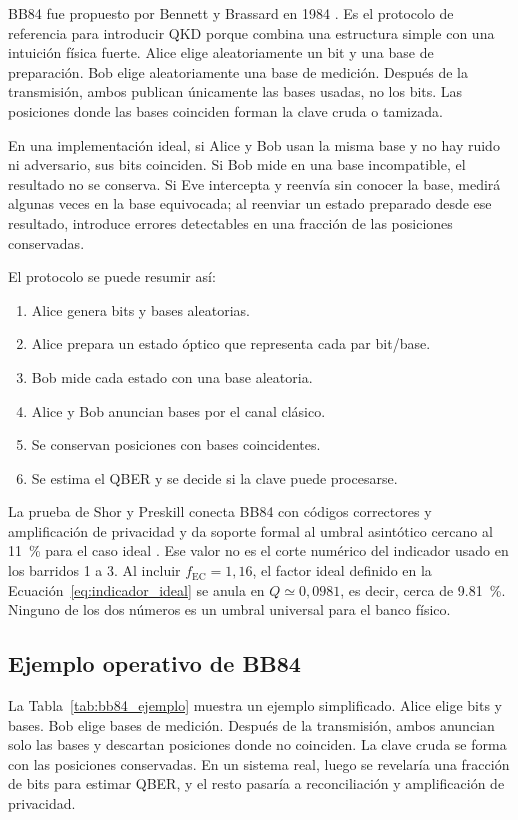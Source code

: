 BB84 fue propuesto por Bennett y Brassard en 1984 \cite{bennettBrassard1984}. Es el protocolo de referencia para introducir QKD porque combina una estructura simple con una intuición física fuerte. Alice elige aleatoriamente un bit y una base de preparación. Bob elige aleatoriamente una base de medición. Después de la transmisión, ambos publican únicamente las bases usadas, no los bits. Las posiciones donde las bases coinciden forman la clave cruda o tamizada.

En una implementación ideal, si Alice y Bob usan la misma base y no hay ruido ni adversario, sus bits coinciden. Si Bob mide en una base incompatible, el resultado no se conserva. Si Eve intercepta y reenvía sin conocer la base, medirá algunas veces en la base equivocada; al reenviar un estado preparado desde ese resultado, introduce errores detectables en una fracción de las posiciones conservadas.

El protocolo se puede resumir así:

\begin{enumerate}
  \item Alice genera bits y bases aleatorias.
  \item Alice prepara un estado óptico que representa cada par bit/base.
  \item Bob mide cada estado con una base aleatoria.
  \item Alice y Bob anuncian bases por el canal clásico.
  \item Se conservan posiciones con bases coincidentes.
  \item Se estima el QBER y se decide si la clave puede procesarse.
\end{enumerate}

La prueba de Shor y Preskill conecta BB84 con códigos correctores y amplificación de privacidad y da soporte formal al umbral asintótico cercano al \SI{11}{\percent} para el caso ideal \cite{shorPreskill2000}. Ese valor no es el corte numérico del indicador usado en los barridos 1 a 3. Al incluir \(f_\mathrm{EC}=1{,}16\), el factor ideal definido en la Ecuación~\ref{eq:indicador_ideal} se anula en \(Q\simeq0{,}0981\), es decir, cerca de \SI{9.81}{\percent}. Ninguno de los dos números es un umbral universal para el banco físico.

\subsection{Ejemplo operativo de BB84}

La Tabla~\ref{tab:bb84_ejemplo} muestra un ejemplo simplificado. Alice elige bits y bases. Bob elige bases de medición. Después de la transmisión, ambos anuncian solo las bases y descartan posiciones donde no coinciden. La clave cruda se forma con las posiciones conservadas. En un sistema real, luego se revelaría una fracción de bits para estimar QBER, y el resto pasaría a reconciliación y amplificación de privacidad.

